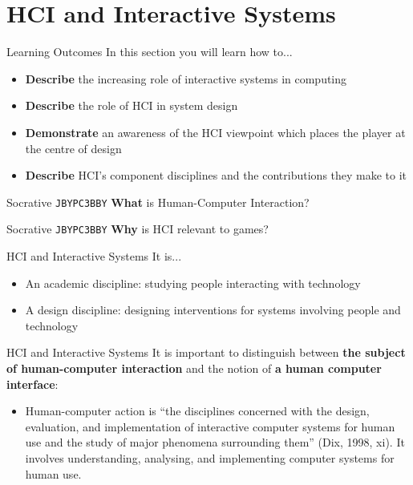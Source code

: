 \part{HCI and Interactive Systems}
\frame{\partpage}

\begin{frame}{Learning Outcomes}
	In this section you will learn how to...
	\begin{itemize}
		\item \textbf{Describe} the increasing role of interactive systems in computing
		\item \textbf{Describe} the role of HCI in system design
		\item \textbf{Demonstrate} an awareness of the HCI viewpoint which places the player at the centre of design
		\item \textbf{Describe} HCI's component disciplines and the contributions they make to it
	\end{itemize}
\end{frame}

\begin{frame}[fragile]{Socrative \texttt{JBYPC3BBY}}
    \textbf{What} is Human-Computer Interaction?
\end{frame}

\begin{frame}[fragile]{Socrative \texttt{JBYPC3BBY}}
    \textbf{Why} is HCI relevant to games?
\end{frame}

\begin{frame}{HCI and Interactive Systems}
	It is...
	\begin{itemize}
		\item An academic discipline: studying people interacting with technology
		\item A design discipline: designing interventions for systems involving people and technology
	\end{itemize}
\end{frame}

\begin{frame}{HCI and Interactive Systems}
	It is important to distinguish between \textbf{the subject of human-computer interaction} and the notion of
	\textbf{a human computer interface}:
	\begin{itemize}
		\item Human-computer action is ``the disciplines concerned with the design, evaluation, 
		and implementation of interactive computer systems for human use and the study of major phenomena
		surrounding them'' (Dix, 1998, xi). It involves understanding, analysing, and implementing computer
		systems for human use.
	\end{itemize}
\end{frame}


